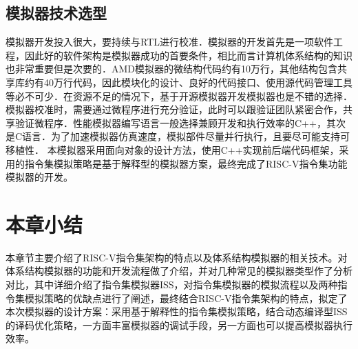 \subsection{模拟器技术选型}
模拟器开发投入很大，要持续与RTL进行校准\cite{gao2007simos}．模拟器的开发首先是一项软件工程，因此好的软件架构是模拟器成功的首要条件，相比而言计算机体系结构的知识也非常重要但是次要的\cite{desikan2001sim}．AMD模拟器的微结构代码约有10万行，其他结构包含共享库约有40万行代码，因此模块化的设计、良好的代码接口、使用源代码管理工具等必不可少．在资源不足的情况下，基于开源模拟器开发模拟器也是不错的选择．
模拟器校准时，需要通过微程序进行充分验证\cite{gao2007simos}，此时可以跟验证团队紧密合作，共享验证微程序．性能模拟器编写语言一般选择兼顾开发和执行效率的C++，其次是C语言．为了加速模拟器仿真速度，模拟部件尽量并行执行，且要尽可能支持可移植性．
本模拟器采用面向对象的设计方法，使用C++实现前后端代码框架，采用的指令集模拟策略是基于解释型的模拟器方案，最终完成了RISC-V指令集功能模拟器的开发。


\section{本章小结}
本章节主要介绍了RISC-V指令集架构的特点以及体系结构模拟器的相关技术。对体系结构模拟器的功能和开发流程做了介绍，并对几种常见的模拟器类型作了分析对比，其中详细介绍了指令集模拟器ISS，对指令集模拟器的模拟流程以及两种指令集模拟策略的优缺点进行了阐述，最终结合RISC-V指令集架构的特点，拟定了本次模拟器的设计方案：采用基于解释性的指令集模拟策略，结合动态编译型ISS的译码优化策略，一方面丰富模拟器的调试手段，另一方面也可以提高模拟器执行效率。